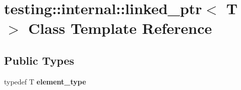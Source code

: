 \hypertarget{classtesting_1_1internal_1_1linked__ptr}{}\section{testing\+:\+:internal\+:\+:linked\+\_\+ptr$<$ T $>$ Class Template Reference}
\label{classtesting_1_1internal_1_1linked__ptr}
\subsection*{Public Types}
\begin{DoxyCompactItemize}
\item 
\mbox{\label{classtesting_1_1internal_1_1linked__ptr_a295c7d1ee4100d916514c4e4385a0063}} 
typedef T {\bfseries element\+\_\+type}
\end{DoxyCompactItemize}
